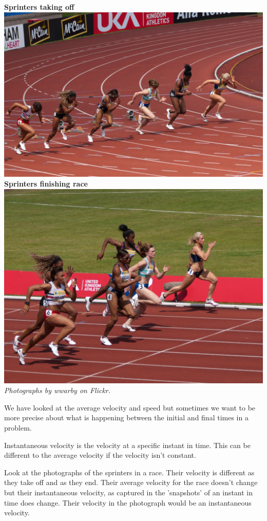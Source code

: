 \begin{minipage}{.5\textwidth}
\begin{center}
\textbf{Sprinters taking off}\\
\includegraphics[width=.8\textwidth]{photos/sprintersstarting_wwarby_flickr.jpg}\\
\textbf{Sprinters finishing race}\\
\includegraphics[width=.8\textwidth]{photos/sprintersending_wwarby_flickr.jpg}\\
\textit{Photographs by wwarby on Flickr.}
\end{center}
\end{minipage}
\begin{minipage}{.5\textwidth}

We have looked at the average velocity and speed but sometimes we want to be more precise about what is happening between the initial and final times in a problem.


Instantaneous velocity is the velocity at a specific instant in time. This can be different to the average velocity if the velocity isn't constant.

Look at the photographs of the sprinters in a race. Their velocity is different as they take off and as they end. Their average velocity for the race doesn't change but their instantaneous velocity, as captured in the 'snapshots' of an instant in time does change. Their velocity in the photograph would be an instantaneous velocity.

\end{minipage}

